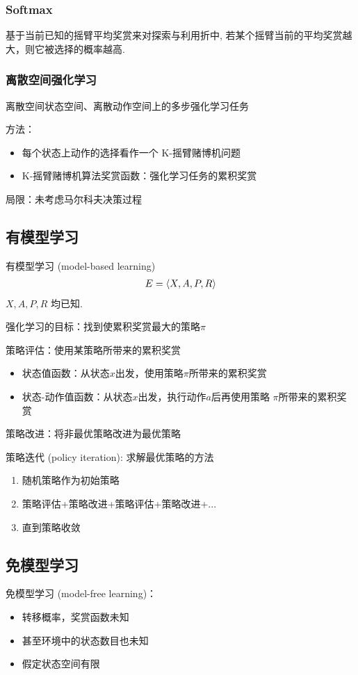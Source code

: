 \subsubsection{Softmax}
基于当前已知的摇臂平均奖赏来对探索与利用折中, 若某个摇臂当前的平均奖赏越大，则它被选择的概率越高. 

\subsubsection{离散空间强化学习}
离散空间状态空间、离散动作空间上的多步强化学习任务

方法：
\begin{itemize}
    \item 每个状态上动作的选择看作一个 K-摇臂赌博机问题
    \item K-摇臂赌博机算法奖赏函数：强化学习任务的累积奖赏
\end{itemize}
局限：未考虑马尔科夫决策过程

\subsection{有模型学习}
有模型学习 (model-based learning)
\begin{align*}
    E=\braket{X, A, P, R}
\end{align*}
$X, A, P, R$ 均已知. 

强化学习的目标：找到使累积奖赏最大的策略$\pi$

策略评估：使用某策略所带来的累积奖赏
\begin{itemize}
    \item 状态值函数：从状态$x$出发，使用策略$\pi$所带来的累积奖赏
    \item 状态-动作值函数：从状态$x$出发，执行动作$a$后再使用策略
    $\pi$所带来的累积奖赏
\end{itemize}

策略改进：将非最优策略改进为最优策略

策略迭代 (policy iteration): 求解最优策略的方法
\begin{enumerate}
    \item 随机策略作为初始策略
    \item 策略评估+策略改进+策略评估+策略改进+...
    \item 直到策略收敛
\end{enumerate}

\subsection{免模型学习}
免模型学习 (model-free learning)：
\begin{itemize}
    \item 转移概率，奖赏函数未知
    \item 甚至环境中的状态数目也未知
    \item 假定状态空间有限
\end{itemize}

